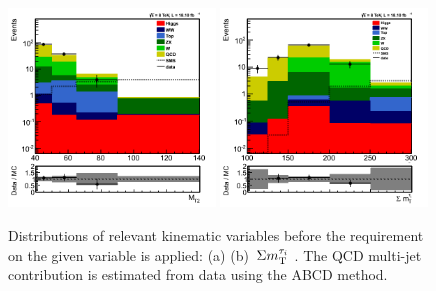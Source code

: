 \begin{figure}[htbp]
\centering
\includegraphics[width=0.49\textwidth]{QCDbginTauTau/Bin1_QCDdatdriven.png}
\includegraphics[width=0.49\textwidth]{QCDbginTauTau/Bin2_QCDdatdriven.png} \\
\caption{Distributions of relevant kinematic variables before the requirement on the given variable
is applied: (a) \mttwo  (b) $\,\Sigma m_{\rm T}^{\tau_i}$ . The QCD multi-jet contribution is estimated from data using the ABCD method.}
\label{fig:5QCDbg}
\end{figure}



